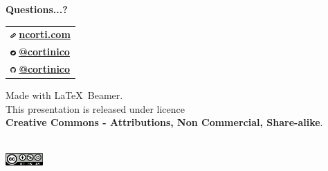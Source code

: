 \documentclass[xcolor=svgnames,11pt]{beamer}
\begin{document}
\begin{frame}{}
\begin{center}
\begin{Huge}
{\color{leorange} \textbf{Questions...?}}
\end{Huge}

\vspace{1.5cm}

\begin{center}
\begin{tabular}{>{\centering\arraybackslash}p{4cm}}
\includegraphics[height=0.2cm]{img/logo_web.pdf} \textbf{\href{https://ncorti.com}{ ncorti.com}} \\
\includegraphics[height=0.2cm]{img/logo_twitter.pdf} \textbf{\href{https://twitter.com/cortinico}{ @cortinico}} \\
\includegraphics[height=0.2cm]{img/logo_gh.pdf} \textbf{\href{https://github.com/cortinico}{ @cortinico}} \\
\end{tabular}
\end{center}

\bigskip

\begin{footnotesize}
Made with \LaTeX\ Beamer.\\
This presentation is released under licence \\
\textbf{Creative Commons - Attributions, Non Commercial, Share-alike}.
\end{footnotesize}
\\
\medskip
\includegraphics[height=0.5cm]{img/cc.png}

\end{center}
\end{frame}
\end{document}
